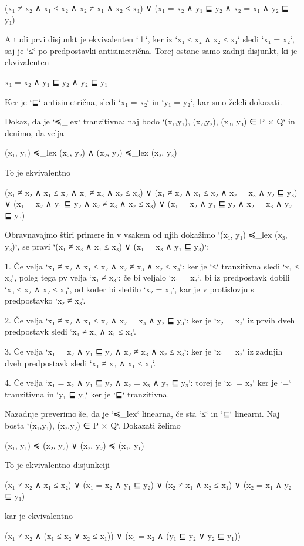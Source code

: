     (x₁ ≠ x₂ ∧ x₁ ≤ x₂ ∧ x₂ ≠ x₁ ∧ x₂ ≤ x₁) ∨
    (x₁ = x₂ ∧ y₁ ⊑ y₂ ∧ x₂ = x₁ ∧ y₂ ⊑ y₁)

A tudi prvi disjunkt je ekvivalenten `⊥`, ker iz `x₁ ≤ x₂ ∧ x₂ ≤ x₁` sledi `x₁ = x₂`, saj je `≤` po predpostavki antisimetrična. Torej ostane samo zadnji disjunkt, ki je ekvivalenten

    x₁ = x₂ ∧ y₁ ⊑ y₂ ∧ y₂ ⊑ y₁

Ker je `⊑` antisimetrična, sledi `x₁ = x₂` in `y₁ = y₂`, kar smo želeli dokazati.

Dokaz, da je `≼_lex` tranzitivna: naj bodo `(x₁,y₁), (x₂,y₂), (x₃, y₃) ∈ P × Q` in denimo, da velja

    (x₁, y₁) ≼_lex (x₂, y₂) ∧ (x₂, y₂) ≼_lex (x₃, y₃)

To je ekvivalentno

    (x₁ ≠ x₂ ∧ x₁ ≤ x₂ ∧ x₂ ≠ x₃ ∧ x₂ ≤ x₃) ∨
    (x₁ ≠ x₂ ∧ x₁ ≤ x₂ ∧ x₂ = x₃ ∧ y₂ ⊑ y₃) ∨
    (x₁ = x₂ ∧ y₁ ⊑ y₂ ∧ x₂ ≠ x₃ ∧ x₂ ≤ x₃) ∨
    (x₁ = x₂ ∧ y₁ ⊑ y₂ ∧ x₂ = x₃ ∧ y₂ ⊑ y₃)

Obravnavajmo štiri primere in v vsakem od njih dokažimo `(x₁, y₁) ≼_lex (x₃, y₃)`, se pravi
`(x₁ ≠ x₃ ∧ x₁ ≤ x₃) ∨ (x₁ = x₃ ∧ y₁ ⊑ y₃)`:

1. Če velja `x₁ ≠ x₂ ∧ x₁ ≤ x₂ ∧ x₂ ≠ x₃ ∧ x₂ ≤ x₃`: ker je `≤` tranzitivna sledi `x₁ ≤ x₃`, poleg tega pv velja `x₁ ≠
   x₃`: če bi veljalo `x₁ = x₃`, bi iz predpostavk dobili `x₃ ≤ x₂ ∧ x₂ ≤ x₃`, od koder bi sledilo `x₂ = x₃`, kar je v
   protislovju s predpostavko `x₂ ≠ x₃`.

2. Če velja `x₁ ≠ x₂ ∧ x₁ ≤ x₂ ∧ x₂ = x₃ ∧ y₂ ⊑ y₃`: ker je `x₂ = x₃` iz prvih dveh predpostavk sledi `x₁ ≠ x₃ ∧ x₁ ≤ x₃`.

3. Če velja `x₁ = x₂ ∧ y₁ ⊑ y₂ ∧ x₂ ≠ x₃ ∧ x₂ ≤ x₃`: ker je `x₁ = x₂` iz zadnjih dveh predpostavk sledi `x₁ ≠ x₃ ∧ x₁ ≤ x₃`.

4. Če velja `x₁ = x₂ ∧ y₁ ⊑ y₂ ∧ x₂ = x₃ ∧ y₂ ⊑ y₃`: torej je `x₁ = x₃` ker je `=` tranzitivna in `y₁ ⊑ y₃` ker je `⊑` tranzitivna.


Nazadnje preverimo še, da je `≼_lex` linearna, če sta `≤` in `⊑` linearni. Naj bosta `(x₁,y₁), (x₂,y₂) ∈ P × Q`. Dokazati želimo

    (x₁, y₁) ≼ (x₂, y₂) ∨ (x₂, y₂) ≼ (x₁, y₁)

To je ekvivalentno disjunkciji

    (x₁ ≠ x₂ ∧ x₁ ≤ x₂) ∨ (x₁ = x₂ ∧ y₁ ⊑ y₂) ∨ (x₂ ≠ x₁ ∧ x₂ ≤ x₁) ∨ (x₂ = x₁ ∧ y₂ ⊑ y₁)

kar je ekvivalentno

    (x₁ ≠ x₂ ∧ (x₁ ≤ x₂ ∨ x₂ ≤ x₁)) ∨ (x₁ = x₂ ∧ (y₁ ⊑ y₂ ∨ y₂ ⊑ y₁))

